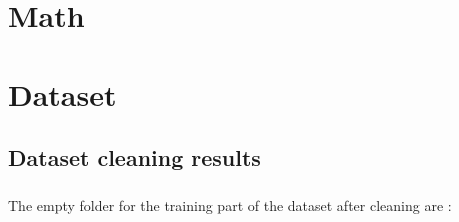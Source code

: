 \chapter{Math}

\chapter{Dataset}

    \section{Dataset cleaning results}\label{sec:annexes:dataset_cleaning_results}
        \paragraph{}The empty folder for the training part of the dataset after cleaning are : 
